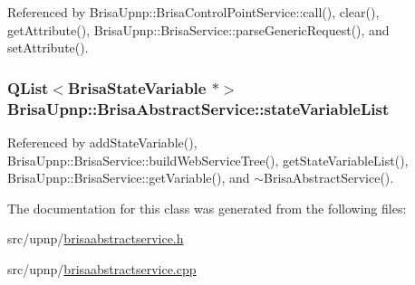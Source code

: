 Referenced by BrisaUpnp::BrisaControlPointService::call(), clear(), getAttribute(), BrisaUpnp::BrisaService::parseGenericRequest(), and setAttribute().\hypertarget{classBrisaUpnp_1_1BrisaAbstractService_a2c7ed42464b85970271105ca2c95417e}{
\subsubsection[{stateVariableList}]{\setlength{\rightskip}{0pt plus 5cm}QList$<${\bf BrisaStateVariable} $\ast$$>$ {\bf BrisaUpnp::BrisaAbstractService::stateVariableList}}}
\label{classBrisaUpnp_1_1BrisaAbstractService_a2c7ed42464b85970271105ca2c95417e}


Referenced by addStateVariable(), BrisaUpnp::BrisaService::buildWebServiceTree(), getStateVariableList(), BrisaUpnp::BrisaService::getVariable(), and $\sim$BrisaAbstractService().

The documentation for this class was generated from the following files:\begin{DoxyCompactItemize}
\item 
src/upnp/\hyperlink{brisaabstractservice_8h}{brisaabstractservice.h}\item 
src/upnp/\hyperlink{brisaabstractservice_8cpp}{brisaabstractservice.cpp}\end{DoxyCompactItemize}
